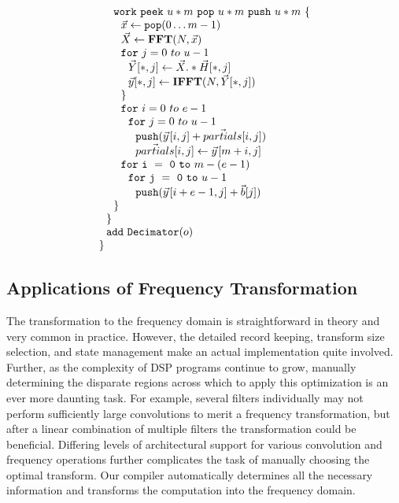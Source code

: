 \begin{transformation}
\begin{equation}
\begin{array}{ll}
    \\
    ~~~~{\tt work}~{\tt peek}~u*m~{\tt pop}~u*m~{\tt push}~u*m~{\tt \{} \\
    ~~~~~~\vec{x} \leftarrow {\tt pop}(0 \dots m - 1) \\
    ~~~~~~\vec{X} \leftarrow \mathbf{FFT} (N, \vec{x}) \\
    ~~~~~~{\tt for}~j=0~to~u-1\\
    ~~~~~~~~\vec{Y}[*,j] \leftarrow \vec{X} .* \vec{H}[*,j] \\
    ~~~~~~~~\vec{y}[*,j] \leftarrow \mathbf{IFFT}(N, \vec{Y}[*,j]) \\
    ~~~~~~{\tt \}} \\
    ~~~~~~{\tt for}~i=0~to~e-1\\
    ~~~~~~~~{\tt for}~j=0~to~u-1\\
    ~~~~~~~~~~{\tt push}(\vec{y}\hspace{1pt}[i,j] + \vec{partials}[i,j])\\
    ~~~~~~~~~~\vec{partials}[i,j] \leftarrow \vec{y}\hspace{1pt}[m+i,j]\\
    ~~~~~~{\tt for~i~=~0~to~}m-(e-1)\\
    ~~~~~~~~{\tt for~j~=~0~to~}u-1\\
    ~~~~~~~~~~{\tt push}(\vec{y}\hspace{1pt}[i+e-1,j] + {\vec b}[j])\\
    ~~~~{\tt \}} \\
    ~~{\tt \}} \\
    ~~{\tt add~Decimator}(o) \\
    {\tt \}} \\
  \end{array}
\end{equation}
\label{trans:freq1}
\end{transformation}

\subsection{Applications of Frequency Transformation}

The transformation to the frequency domain is straightforward in
theory and very common in practice. However, the detailed record
keeping, transform size selection, and state management make an actual
implementation quite involved.  Further, as the complexity of DSP
programs continue to grow, manually determining the disparate regions
across which to apply this optimization is an ever more daunting task.
For example, several filters individually may not perform sufficiently
large convolutions to merit a frequency transformation, but after a
linear combination of multiple filters the transformation could be
beneficial.  Differing levels of architectural support for various
convolution and frequency operations further complicates the task of
manually choosing the optimal transform.  Our compiler automatically
determines all the necessary information and transforms the
computation into the frequency domain.

